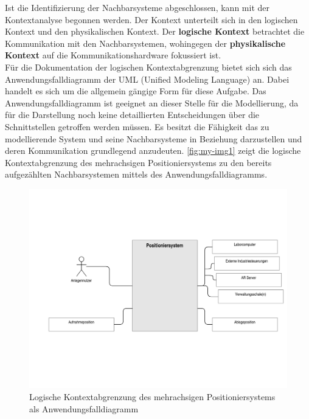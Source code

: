 \documentclass[../../../Bachelorarbeit.tex]{subfiles}
\begin{document}
Ist die Identifizierung der Nachbarsysteme abgeschlossen, kann mit der Kontextanalyse begonnen werden. Der Kontext unterteilt sich in den logischen Kontext und den physikalischen Kontext. Der \textbf{logische Kontext} betrachtet die Kommunikation mit den Nachbarsystemen, wohingegen der \textbf{physikalische Kontext} auf die Kommunikationshardware fokussiert ist.\\ %
Für die Dokumentation der logischen Kontextabgrenzung bietet sich sich das Anwendungsfalldiagramm der UML (Unified Modeling Language) an. Dabei handelt es sich um die allgemein gängige Form für diese Aufgabe. Das Anwendungsfalldiagramm ist geeignet an dieser Stelle für die Modellierung, da für die Darstellung noch keine detaillierten Entscheidungen über die Schnittstellen getroffen werden müssen. Es besitzt die Fähigkeit das zu modellierende System und seine Nachbarsysteme in Beziehung darzustellen und deren Kommunikation grundlegend anzudeuten. \autoref{fig:my-img1} zeigt die logische Kontextabgrenzung des mehrachsigen Positioniersystems zu den bereits aufgezählten Nachbarsystemen mittels des Anwendungsfalldiagramms.

\begin{figure}[h]
    \centering
    \includegraphics[width=\textwidth]{Images/kontextana.pdf}
    \caption[Logische Kontextabgrenzung]{Logische Kontextabgrenzung des mehrachsigen Positioniersystems als Anwendungsfalldiagramm}
    \label{fig:my-img1}
\end{figure}
\end{document}
